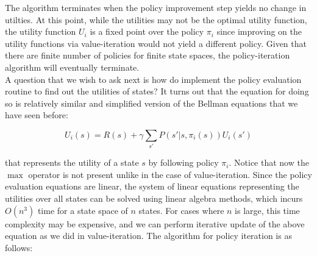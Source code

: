 \documentclass[11pt]{article}
\begin{document}
The algorithm terminates when the policy improvement step yields no change in utilties. At this point, while the utilities may not be the optimal utility function, the utility function $U_i$ is a fixed point over the policy $\pi_i$ since improving on the utility functions via value-iteration would not yield a different policy. Given that there are finite number of policies for finite state spaces, the policy-iteration algorithm will eventually terminate.\\

A question that we wish to ask next is how do implement the policy evaluation routine to find out the utilities of states? It turns out that the equation for doing so is relatively similar and simplified version of the Bellman equations that we have seen before:

$$
U_i(s) = R(s) + \gamma \sum_{s'} P(s' | s, \pi_i(s)) U_i(s')
$$

that represents the utility of a state $s$ by following policy $\pi_i$. Notice that now the $\max$ operator is not present unlike in the case of value-iteration. Since the policy evaluation equations are linear, the system of linear equations representing the utilities over all states can be solved using linear algebra methods, which incurs $O(n^3)$ time for a state space of $n$ states. For cases where $n$ is large, this time complexity may be expensive, and we can perform iterative update of the above equation as we did in value-iteration. The algorithm for policy iteration is as follows:
\end{document}
